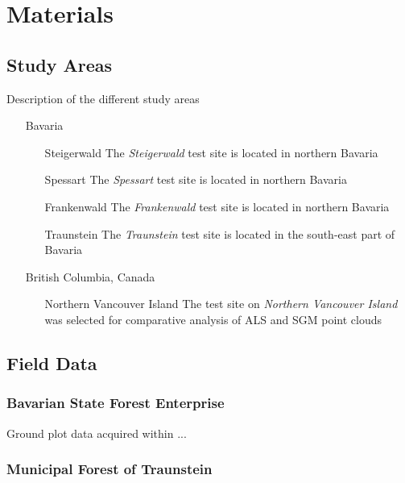 \chapter{Materials}
\label{chp:Mat}


\section{Study Areas}\label{sec:StudyAreas}

Description of the different study areas 

\begin{itemize}
	\item[Bavaria]
		\begin{itemize}
			\item[Steigerwald] The \emph{Steigerwald} test site is located in northern Bavaria
			\item[Spessart]  The \emph{Spessart} test site is located in northern Bavaria
			\item[Frankenwald]  The \emph{Frankenwald} test site is located in northern Bavaria
			\item[Traunstein]  The \emph{Traunstein} test site is located in the south-east part of Bavaria
		\end{itemize} 
	\item[British Columbia, Canada]
		\begin{itemize}
			\item [Northern Vancouver Island] The test site on \emph{Northern Vancouver Island} was selected for comparative analysis of ALS and SGM point clouds
		\end{itemize}
\end{itemize}


\section{Field Data}\label{sec:FieldData}

\subsection{Bavarian State Forest Enterprise}

Ground plot data acquired within ...

\subsection{Municipal Forest of Traunstein}

